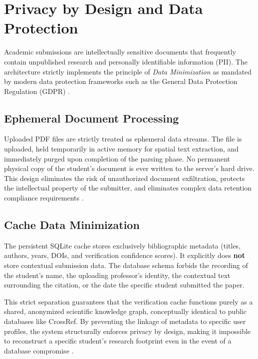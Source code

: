 \documentclass[12pt,a4paper,oneside]{report}
\begin{document}
\section{Privacy by Design and Data Protection}

Academic submissions are intellectually sensitive documents that frequently contain unpublished research and personally identifiable information (PII). The architecture strictly implements the principle of \textit{Data Minimization} as mandated by modern data protection frameworks such as the General Data Protection Regulation (GDPR) \cite{gdpr2016}.

\subsection{Ephemeral Document Processing}

Uploaded PDF files are strictly treated as ephemeral data streams. The file is uploaded, held temporarily in active memory for spatial text extraction, and immediately purged upon completion of the parsing phase. No permanent physical copy of the student's document is ever written to the server's hard drive. This design eliminates the risk of unauthorized document exfiltration, protects the intellectual property of the submitter, and eliminates complex data retention compliance requirements \cite{gdpr2016}.

\subsection{Cache Data Minimization}

The persistent SQLite cache stores exclusively bibliographic metadata (titles, authors, years, DOIs, and verification confidence scores). It explicitly does \textbf{not} store contextual submission data. The database schema forbids the recording of the student's name, the uploading professor's identity, the contextual text surrounding the citation, or the date the specific student submitted the paper. 

This strict separation guarantees that the verification cache functions purely as a shared, anonymized scientific knowledge graph, conceptually identical to public databases like CrossRef. By preventing the linkage of metadata to specific user profiles, the system structurally enforces privacy by design, making it impossible to reconstruct a specific student's research footprint even in the event of a database compromise \cite{gdpr2016}.
\end{document}
